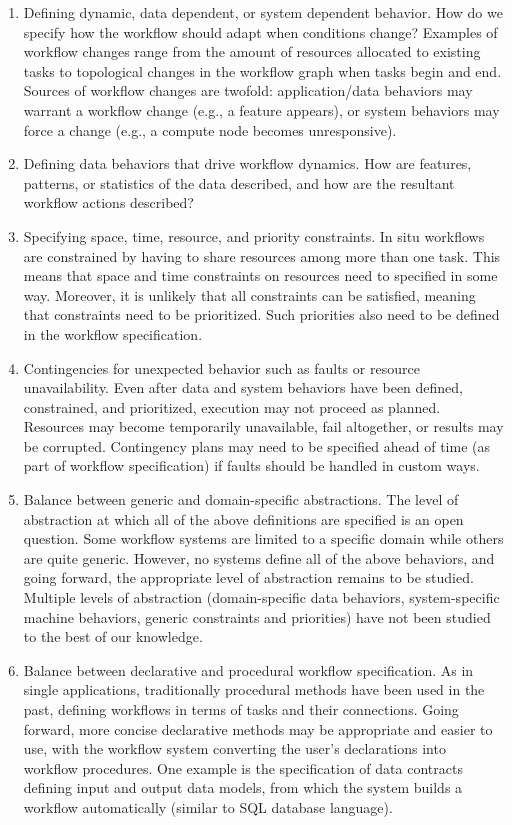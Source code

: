 \begin{refsection}
\begin{enumerate}
\item	
Defining dynamic, data dependent, or system dependent behavior. How do we specify how the workflow should adapt when conditions change? Examples of workflow changes range from the amount of resources allocated to existing tasks to topological changes in the workflow graph when tasks begin and end. Sources of workflow changes are twofold: application/data behaviors may warrant a workflow change (e.g., a feature appears), or system behaviors may force a change (e.g., a compute node becomes unresponsive).
\item 
Defining data behaviors that drive workflow dynamics. How are features, patterns, or statistics of the data described, and how are the resultant workflow actions described?
\item 
Specifying space, time, resource, and priority constraints. In situ workflows are constrained by having to share resources among more than one task. This means that space and time constraints on resources need to specified in some way. Moreover, it is unlikely that all constraints can be satisfied, meaning that constraints need to be prioritized. Such priorities also need to be defined in the workflow specification.
\item 
Contingencies for unexpected behavior such as faults or resource unavailability. Even after data and system behaviors have been defined, constrained, and prioritized, execution may not proceed as planned. Resources may become temporarily unavailable, fail altogether, or results may be corrupted. Contingency plans may need to be specified ahead of time (as part of workflow specification) if faults should be handled in custom ways.
\item 
Balance between generic and domain-specific abstractions. The level of abstraction at which all of the above definitions are specified is an open question. Some workflow systems are limited to a specific domain while others are quite generic. However, no systems define all of the above behaviors, and going forward, the appropriate level of abstraction remains to be studied. Multiple levels of abstraction (domain-specific data behaviors, system-specific machine behaviors, generic constraints and priorities) have not been studied to the best of our knowledge.
\item 
Balance between declarative and procedural workflow specification. As in single applications, traditionally procedural methods have been used in the past, defining workflows in terms of tasks and their connections. Going forward, more concise declarative methods may be appropriate and easier to use, with the workflow system converting the user’s declarations into workflow procedures. One example is the specification of data contracts defining input and output data models, from which the system builds a workflow automatically (similar to SQL database language).
\end{enumerate}


\end{refsection}
